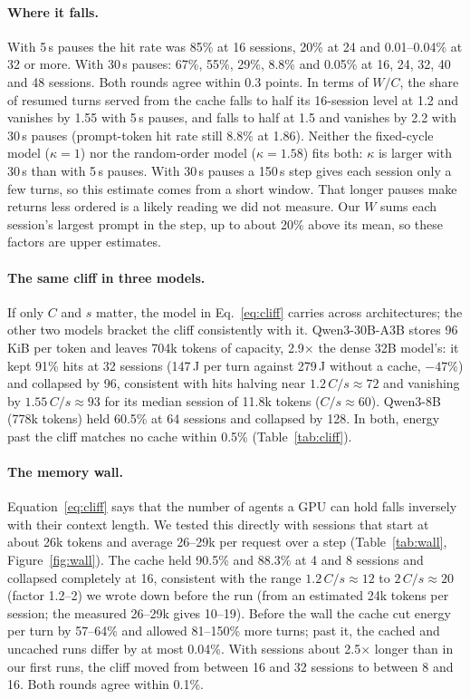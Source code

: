 \paragraph{Where it falls.} With 5\,s pauses the hit rate was 85\% at 16 sessions, 20\% at 24 and 0.01--0.04\% at 32 or
more. With 30\,s pauses: 67\%, 55\%, 29\%, 8.8\% and 0.05\% at 16, 24, 32, 40 and 48 sessions. Both
rounds agree within 0.3 points. In terms of $W/C$, the share of resumed turns served from the cache falls to half its 16-session level at 1.2 and vanishes by 1.55 with 5\,s pauses, and falls to half
at 1.5 and vanishes by 2.2 with 30\,s pauses (prompt-token hit rate still 8.8\% at 1.86). Neither the fixed-cycle model ($\kappa=1$) nor the random-order model ($\kappa=1.58$) fits both:
$\kappa$ is larger with 30\,s than with 5\,s pauses. With 30\,s pauses a 150\,s step gives each session only a few turns, so this estimate comes from a short window. That longer pauses make returns less
ordered is a likely reading we did not measure. Our $W$ sums each session's largest
prompt in the step, up to about 20\% above its mean, so these factors are upper estimates.

\paragraph{The same cliff in three models.} If only $C$ and $s$ matter, the model in Eq.~\eqref{eq:cliff} carries across architectures; the other two models bracket the cliff consistently with it. Qwen3-30B-A3B stores 96\,KiB per token and leaves 704k tokens of capacity, 2.9$\times$ the
dense 32B model's: it kept 91\% hits at 32 sessions (147\,J per turn against 279\,J without a cache, $-47\%$) and
collapsed by 96, consistent with hits halving near $1.2\,C/s\approx72$ and vanishing by $1.55\,C/s\approx93$ for its median session
of 11.8k tokens ($C/s\approx60$). Qwen3-8B (778k tokens) held 60.5\% at 64
sessions and collapsed by 128. In both, energy past the cliff matches no cache within 0.5\% (Table~\ref{tab:cliff}).

\paragraph{The memory wall.} Equation~\eqref{eq:cliff} says that the number of agents a GPU can hold falls inversely
with their context length. We tested this directly with sessions that start at about 26k tokens and average 26--29k per request over a
step (Table~\ref{tab:wall}, Figure~\ref{fig:wall}). The cache held 90.5\% and 88.3\% at 4 and 8 sessions and collapsed completely at 16,
consistent with the range $1.2\,C/s\approx12$ to $2\,C/s\approx20$ (factor 1.2--2) we wrote down before the run (from an estimated 24k tokens per
session; the measured 26--29k gives 10--19). Before the wall the cache cut energy
per turn by 57--64\% and allowed 81--150\% more turns; past it, the cached and uncached runs differ by at most 0.04\%. With
sessions about 2.5$\times$ longer than in our first runs, the cliff moved from between 16 and 32 sessions to between
8 and 16. Both rounds agree within 0.1\%.

